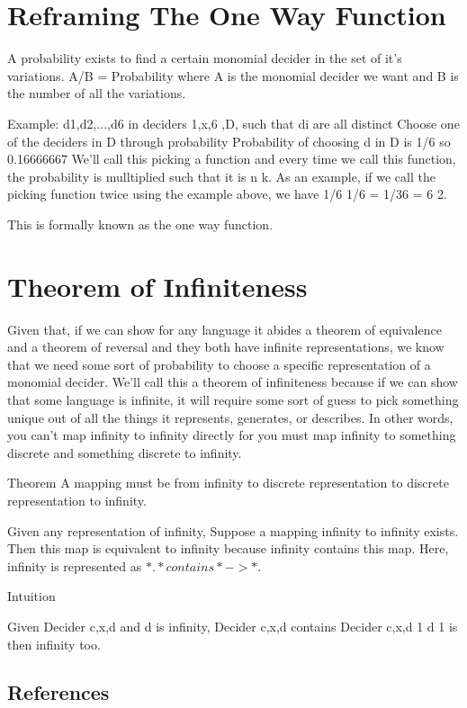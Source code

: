 \section{Reframing The One Way Function}

A probability exists to find a certain monomial decider in the set of it's variations. A/B = Probability where A is the monomial decider we want and B is the number of all the variations.

Example:
d1,d2,...,d6 in deciders 1,x,6 ,D, such that di are all distinct
Choose one of the deciders in D through probability
Probability of choosing d in D is 1/6 so 0.16666667
We'll call this picking a function and every time we call this function, the probability is mulltiplied such that it is n k. As an example, if we call the picking function twice using the example above, we have 1/6 1/6 = 1/36 = 6 2.

This is formally known as the one way function.

\section{Theorem of Infiniteness}

Given that, if we can show for any language it abides a theorem of equivalence and a theorem of reversal and they both have infinite representations, we know that we need some sort of probability to choose a specific representation of a monomial decider. We'll call this a theorem of infiniteness because if we can show that some language is infinite, it will require some sort of guess to pick something unique out of all the things it represents, generates, or describes. In other words, you can't map infinity to infinity directly for you must map infinity to something discrete and something discrete to infinity.

Theorem
A mapping must be from infinity to discrete representation to discrete representation to infinity.

Given any representation of infinity,
Suppose a mapping infinity to infinity exists.
Then this map is equivalent to infinity because 
infinity contains this map.
Here, infinity is represented as $\ast. \ast contains \ast -> \ast.$

Intuition

Given Decider c,x,d and d is infinity,
Decider c,x,d contains Decider c,x,d 1
d 1 is then infinity too.


\subsection{References}

